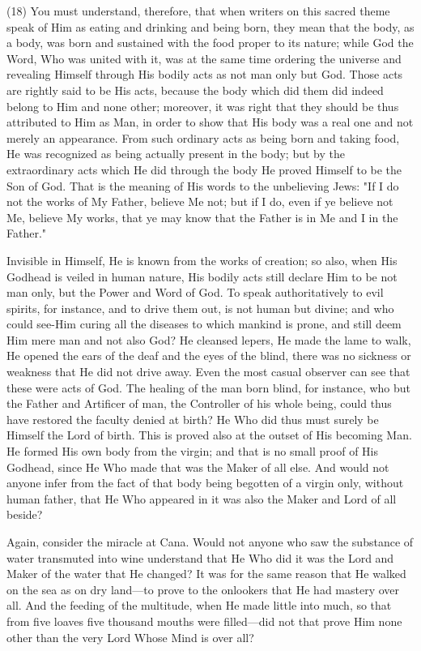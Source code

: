 \documentclass[9pt, twocolumn, oneside, a4paper]{memoir}
\begin{document}
\textsc{(18)} You must understand, therefore, that when writers       on this sacred theme speak of Him as eating and drinking and being born, they       mean that the body, as a body, was born and sustained with the food proper to       its nature; while God the Word, Who was united with it, was at the same time       ordering the universe and revealing Himself through His bodily acts as not man       only but God. Those acts are rightly said to be His acts, because the body which       did them did indeed belong to Him and none other; moreover, it was right that       they should be thus attributed to Him as Man, in order to show that His body was       a real one and not merely an appearance. From such ordinary acts as being born       and taking food, He was recognized as being actually present in the body; but by       the extraordinary acts which He did through the body He proved Himself to be the       Son of God. That is the meaning of His words to the unbelieving Jews:       "If I do not the works of My Father, believe Me not;       but if I do, even if ye believe not Me, believe My works, that ye may know       that the Father is in Me and I in the Father."

Invisible in Himself, He is known from the works of creation; so also, when       His Godhead is veiled in human nature, His bodily acts still declare Him to be       not man only, but the Power and Word of God. To speak authoritatively to evil       spirits, for instance, and to drive them out, is not human but divine; and who       could see-Him curing all the diseases to which mankind is prone, and still deem       Him mere man and not also God? He cleansed lepers, He made the lame to walk, He       opened the ears of the deaf and the eyes of the blind, there was no sickness or       weakness that He did not drive away. Even the most casual observer can see that       these were acts of God. The healing of the man born blind, for instance, who but       the Father and Artificer of man, the Controller of his whole being, could thus       have restored the faculty denied at birth? He Who did thus must surely be       Himself the Lord of birth. This is proved also at the outset of His becoming       Man. He formed His own body from the virgin; and that is no small proof of His       Godhead, since He Who made that was the Maker of all else. And would not anyone       infer from the fact of that body being begotten of a virgin only, without human       father, that He Who appeared in it was also the Maker and Lord of all beside?   

Again, consider the miracle at Cana. Would not anyone who saw the substance       of water transmuted into wine understand that He Who did it was the Lord and       Maker of the water that He changed? It was for the same reason that He walked on       the sea as on dry land—to prove to the onlookers that He had mastery over all.       And the feeding of the multitude, when He made little into much, so that from       five loaves five thousand mouths were filled—did not that prove Him none other       than the very Lord Whose Mind is over all?   
\end{document}
